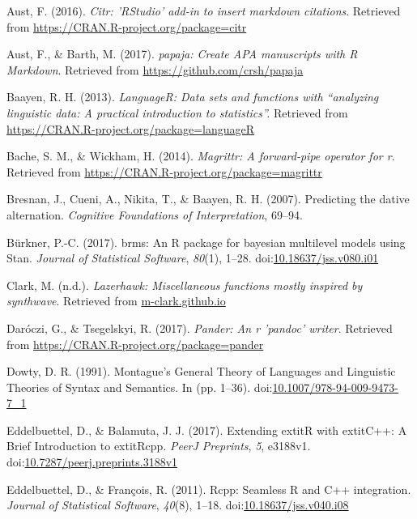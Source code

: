 \documentclass[english,floatsintext,man]{apa6}
\theoremstyle{definition}
\theoremstyle{definition}
\theoremstyle{definition}
\theoremstyle{remark}
\begin{document}
\setlength{\parindent}{-0.5in} \setlength{\leftskip}{0.5in}
\linespread{1}

\hypertarget{refs}{}
\hypertarget{ref-R-citr}{}
Aust, F. (2016). \emph{Citr: 'RStudio' add-in to insert markdown
citations}. Retrieved from \url{https://CRAN.R-project.org/package=citr}

\hypertarget{ref-R-papaja}{}
Aust, F., \& Barth, M. (2017). \emph{papaja: Create APA manuscripts with
R Markdown}. Retrieved from \url{https://github.com/crsh/papaja}

\hypertarget{ref-R-languageR}{}
Baayen, R. H. (2013). \emph{LanguageR: Data sets and functions with
``analyzing linguistic data: A practical introduction to statistics''.}
Retrieved from \url{https://CRAN.R-project.org/package=languageR}

\hypertarget{ref-R-magrittr}{}
Bache, S. M., \& Wickham, H. (2014). \emph{Magrittr: A forward-pipe
operator for r}. Retrieved from
\url{https://CRAN.R-project.org/package=magrittr}

\hypertarget{ref-Bresnan2007}{}
Bresnan, J., Cueni, A., Nikita, T., \& Baayen, R. H. (2007). Predicting
the dative alternation. \emph{Cognitive Foundations of Interpretation},
69--94.

\hypertarget{ref-R-brms}{}
Bürkner, P.-C. (2017). brms: An R package for bayesian multilevel models
using Stan. \emph{Journal of Statistical Software}, \emph{80}(1), 1--28.
doi:\href{https://doi.org/10.18637/jss.v080.i01}{10.18637/jss.v080.i01}

\hypertarget{ref-R-lazerhawk}{}
Clark, M. (n.d.). \emph{Lazerhawk: Miscellaneous functions mostly
inspired by synthwave}. Retrieved from \url{m-clark.github.io}

\hypertarget{ref-R-pander}{}
Daróczi, G., \& Tsegelskyi, R. (2017). \emph{Pander: An r 'pandoc'
writer}. Retrieved from \url{https://CRAN.R-project.org/package=pander}

\hypertarget{ref-Dowty1991}{}
Dowty, D. R. (1991). Montague's General Theory of Languages and
Linguistic Theories of Syntax and Semantics. In (pp. 1--36).
doi:\href{https://doi.org/10.1007/978-94-009-9473-7_1}{10.1007/978-94-009-9473-7\_1}

\hypertarget{ref-R-Rcpp_b}{}
Eddelbuettel, D., \& Balamuta, J. J. (2017). Extending extitR with
extitC++: A Brief Introduction to extitRcpp. \emph{PeerJ Preprints},
\emph{5}, e3188v1.
doi:\href{https://doi.org/10.7287/peerj.preprints.3188v1}{10.7287/peerj.preprints.3188v1}

\hypertarget{ref-R-Rcpp_a}{}
Eddelbuettel, D., \& François, R. (2011). Rcpp: Seamless R and C++
integration. \emph{Journal of Statistical Software}, \emph{40}(8),
1--18.
doi:\href{https://doi.org/10.18637/jss.v040.i08}{10.18637/jss.v040.i08}
\end{document}
